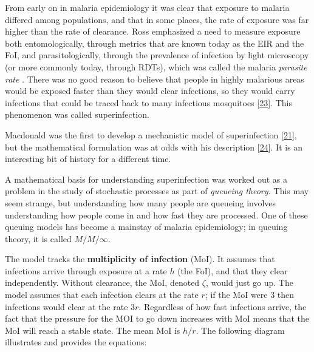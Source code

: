 \documentclass[
]{book}
\begin{document}
From early on in malaria epidemiology it was clear that exposure to malaria differed among populations, and that in some places, the rate of exposure was far higher than the rate of clearance. Ross emphasized a need to measure exposure both entomologically, through metrics that are known today as the EIR and the FoI, and parasitologically, through the prevalence of infection by light microscopy (or more commonly today, through RDTs), which was called the malaria \emph{parasite rate} . There was no good reason to believe that people in highly malarious areas would be exposed faster than they would clear infections, so they would carry infections that could be traced back to many infectious mosquitoes {[}\protect\hyperlink{ref-WaltonG1947ControlMalaria}{23}{]}. This phenomenon was called superinfection.

Macdonald was the first to develop a mechanistic model of superinfection {[}\protect\hyperlink{ref-MacdonaldG1950_Superinfection}{21}{]}, but the mathematical formulation was at odds with his description {[}\protect\hyperlink{ref-FinePEM1975SuperinfectionProblem}{24}{]}. It is an interesting bit of history for a different time.

A mathematical basis for understanding superinfection was worked out as a problem in the study of stochastic processes as part of \emph{queueing theory.} This may seem strange, but understanding how many people are queueing involves understanding how people come in and how fast they are processed. One of these queuing models has become a mainstay of malaria epidemiology; in queuing theory, it is called \(M/M/\infty\).

The model tracks the \textbf{multiplicity of infection} (MoI). It assumes that infections arrive through exposure at a rate \(h\) (the FoI), and that they clear independently. Without clearance, the MoI, denoted \(\zeta\), would just go up. The model assumes that each infection clears at the rate \(r\); if the MoI were \(3\) then infections would clear at the rate \(3r\). Regardless of how fast infections arrive, the fact that the pressure for the MOI to go down increases with MoI means that the MoI will reach a stable state. The mean MoI is \(h/r.\) The following diagram illustrates and provides the equations:
\end{document}
